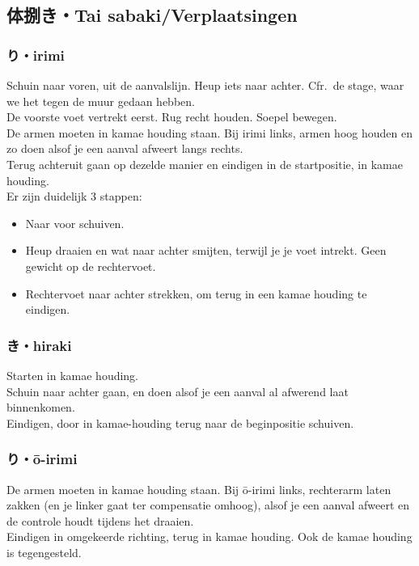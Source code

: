 \subsection{体捌き・Tai sabaki/Verplaatsingen}
\subsubsection{り・irimi}
Schuin naar voren, uit de aanvalslijn. Heup iets naar achter. Cfr.\ de stage, waar we het tegen de muur gedaan hebben.\\
De voorste voet vertrekt eerst. Rug recht houden. Soepel bewegen.\\
De armen moeten in kamae houding staan. Bij irimi links, armen hoog houden en zo doen alsof je een aanval afweert langs rechts.\\
Terug achteruit gaan op dezelde manier en eindigen in de startpositie, in kamae houding.\\
Er zijn duidelijk 3 stappen:\\
\begin{itemize}
\item Naar voor schuiven.
\item Heup draaien en wat naar achter smijten, terwijl je je voet intrekt. Geen gewicht op de rechtervoet.
\item Rechtervoet naar achter strekken, om terug in een kamae houding te eindigen.
\end{itemize}

\subsubsection{き・hiraki}
Starten in kamae houding.\\
Schuin naar achter gaan, en doen alsof je een aanval al afwerend laat binnenkomen.\\
Eindigen, door in kamae-houding terug naar de beginpositie schuiven.

\subsubsection{り・\={o}-irimi}
De armen moeten in kamae houding staan. Bij \={o}-irimi links, rechterarm laten zakken (en je linker gaat ter compensatie omhoog), alsof je een aanval afweert en de controle houdt tijdens het draaien.\\
Eindigen in omgekeerde richting, terug in kamae houding. Ook de kamae houding is tegengesteld.

